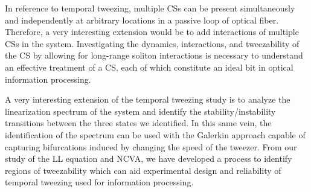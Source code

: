 \documentclass[aps,floatfix,showpacs,preprintnumbers,twocolumn,nofootinbib]{revtex4}
\begin{document}
In reference to temporal tweezing, multiple CSs can be present simultaneously and independently at arbitrary locations in a passive loop of optical fiber.  Therefore, a very interesting extension would be to add interactions of multiple CSs in the system.  Investigating the dynamics, interactions, and tweezability of the CS by allowing for long-range soliton interactions is necessary to understand an effective treatment of a CS, each of which constitute an ideal bit in optical information processing.

A very interesting extension of the temporal tweezing study is to analyze the linearization spectrum of the system and identify the stability/instability transitions between the three states we identified.  In this same vein, the identification of the spectrum can be used with the Galerkin approach capable of capturing bifurcations induced by changing the speed of the tweezer.  From our study of the LL equation and NCVA, we have developed a process to identify regions of tweezability which can aid experimental design and reliability of temporal tweezing used for information processing.
 

%




\clearpage
\onecolumngrid
\appendix 


\clearpage
\twocolumngrid

\end{document}
